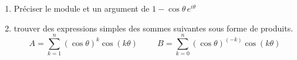 \begin{enumerate}
\item Préciser le module et un argument de
$1-\cos \theta \,e^{i \theta}$
\item
trouver des expressions simples des sommes suivantes sous forme de produits. 
\begin{displaymath}
A = \sum_{k=1}^{n}(\cos\theta)^k \cos(k\theta)\hspace{1cm}
B = \sum_{k=0}^{n}(\cos\theta)^{(-k)}\cos(k\theta)
\end{displaymath}
\end{enumerate}

